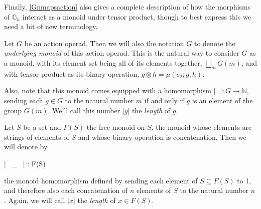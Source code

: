 Finally, \cref{Gnmapsaction} also gives a complete description of how the morphisms of $\mathbb{G}_n$ interact as a monoid under tensor product, though to best express this we need a bit of new terminology.

\begin{defn} Let $G$ be an action operad. Then we will also the notation $G$ to denote the \emph{underlying monoid} of this action operad. This is the natural way to consider $G$ as a monoid, with its element set being all of its elements together, $\bigsqcup_m G(m)$, and with tensor product as its binary operation, $g \otimes h = \mu(e_2; g, h)$.

Also, note that this monoid comes equipped with a homomorphism $| \, \_ \, | : G \to \mathbb{N}$, sending each $g \in G$ to the natural number $m$ if and only if $g$ is an element of the group $G(m)$. We'll call this number $|g|$ the \emph{length} of $g$.
\end{defn}

\begin{defn}\label{lengthdef} Let $S$ be a set and $F(S)$ the free monoid on $S$, the monoid whose elements are strings of elements of $S$ and whose binary operation is concatenation. Then we will denote by
\begin{eq*} | \, \_ \, | : F(S) \to {} \end{eq*}
the monoid homomorphism defined by sending each element of $S \subseteq F(S)$ to 1, and therefore also each concatenation of $n$ elements of $S$ to the natural number $n$. Again, we will call $|x|$ the \emph{length} of $x \in F(S)$.
\end{defn}

